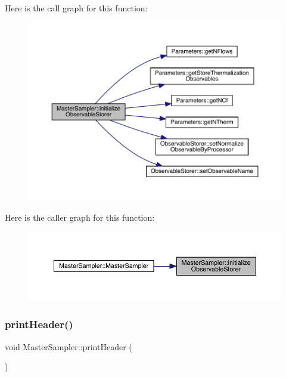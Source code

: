 Here is the call graph for this function\+:\nopagebreak
\begin{figure}[H]
\begin{center}
\leavevmode
\includegraphics[width=350pt]{class_master_sampler_a88e2eec68ea6bd60cc3f375ac04a8ded_cgraph}
\end{center}
\end{figure}
Here is the caller graph for this function\+:\nopagebreak
\begin{figure}[H]
\begin{center}
\leavevmode
\includegraphics[width=350pt]{class_master_sampler_a88e2eec68ea6bd60cc3f375ac04a8ded_icgraph}
\end{center}
\end{figure}
\mbox{\label{class_master_sampler_a51b207672764c100e1ae258fd2e33fcf}} 
\subsubsection{\texorpdfstring{printHeader()}{printHeader()}}
{\footnotesize\ttfamily void Master\+Sampler\+::print\+Header (\begin{DoxyParamCaption}{ }\end{DoxyParamCaption})\hspace{0.3cm}{\ttfamily [virtual]}}



